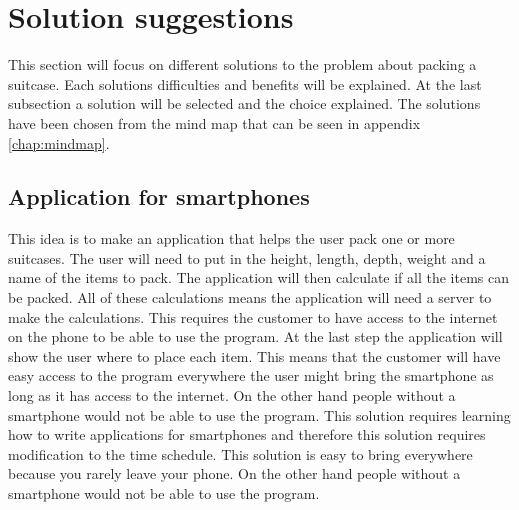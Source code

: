\section{Solution suggestions} 	
This section will focus on different solutions to the problem about packing a suitcase. Each solutions difficulties and benefits will be explained. At the last subsection a solution will be selected and the choice explained. The solutions have been chosen from the mind map that can be seen in appendix \ref{chap:mindmap}.
\newline
\subsection{Application for smartphones}
This idea is to make an application that helps the user pack one or more suitcases. The user will need to put in the height, length, depth, weight and a name of the items to pack. The application will then calculate if all the items can be packed. All of these calculations means the application will need a server to make the calculations. This requires the customer to have access to the internet on the phone to be able to use the program. At the last step the application will show the user where to place each item. This means that the customer will have easy access to the program everywhere the user might bring the smartphone as long as it has access to the internet. On the other hand people without a smartphone would not be able to use the program. This solution requires learning how to write applications for smartphones and therefore this solution requires modification to the time schedule. This solution is easy to bring everywhere because you rarely leave your phone. On the other hand people without a smartphone would not be able to use the program.
\newline
